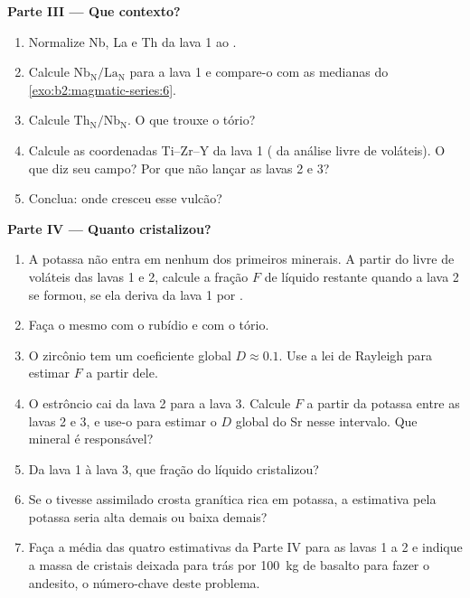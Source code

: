 \begin{problem}
\noindent\textbf{Parte III --- Que contexto?}
\begin{enumerate}[resume]
\item Normalize Nb, La e Th da lava 1 ao .
\item Calcule $\mathrm{Nb_N}/\mathrm{La_N}$ para a lava 1 e compare-o com as medianas
do \cref{exo:b2:magmatic-series:6}.
\item Calcule $\mathrm{Th_N}/\mathrm{Nb_N}$. O que trouxe o tório?
\item Calcule as coordenadas Ti--Zr--Y da lava 1 ( da análise livre de
voláteis). O que diz seu campo? Por que não lançar as lavas 2 e 3?
\item Conclua: onde cresceu esse vulcão?
\end{enumerate}

\noindent\textbf{Parte IV --- Quanto cristalizou?}
\begin{enumerate}[resume]
\item A potassa não entra em nenhum dos primeiros minerais. A partir do  livre de voláteis das
lavas 1 e 2, calcule a fração $F$ de líquido restante quando a lava 2 se formou, se ela
deriva da lava 1 por .
\item Faça o mesmo com o rubídio e com o tório.
\item O zircônio tem um coeficiente global $D \approx 0.1$. Use a lei de Rayleigh para estimar $F$ a partir
dele.
\item O estrôncio cai da lava 2 para a lava 3. Calcule $F$ a partir da potassa entre as lavas 2 e
3, e use-o para estimar o $D$ global do Sr nesse intervalo. Que mineral é
responsável?
\item Da lava 1 à lava 3, que fração do líquido cristalizou?
\item Se o  tivesse assimilado crosta granítica rica em potassa, a estimativa pela
potassa seria alta demais ou baixa demais?
\item Faça a média das quatro estimativas da Parte IV para as lavas 1 a 2 e indique a massa de
cristais deixada para trás por \qty{100}{kg} de basalto para fazer o andesito, o número-chave
deste problema.
\end{enumerate}
\end{problem}
